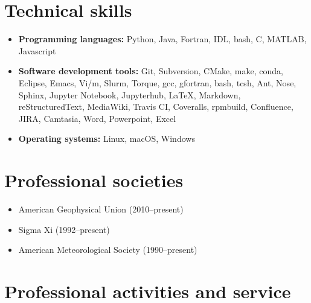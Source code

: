\documentclass[letterpaper]{resume}
\begin{document}

\section{Technical skills}
\vspace{0.5em}

\begin{itemize}

  \item \textbf{Programming languages:}
    Python, Java, Fortran, IDL, bash, C, MATLAB, Javascript

  \item \textbf{Software development tools:}
    Git, Subversion, CMake, make, conda, Eclipse, Emacs, Vi/m, Slurm,
    Torque, gcc, gfortran, bash, tcsh, Ant, Nose, Sphinx, Jupyter
    Notebook, Jupyterhub, \LaTeX, Markdown, reStructuredText,
    MediaWiki, {Travis CI}, Coveralls, rpmbuild, Confluence, JIRA,
    Camtasia, Word, Powerpoint, Excel

  \item \textbf{Operating systems:}
    Linux, macOS, Windows

\end{itemize}


\section{Professional societies}
\vspace{0.5em}

\begin{itemize}
  \item American Geophysical Union (2010--present) 
  \item Sigma Xi (1992--present)
  \item American Meteorological Society (1990--present)
\end{itemize}


\section{Professional activities and service}
\vspace{0.5em}
\end{document}
